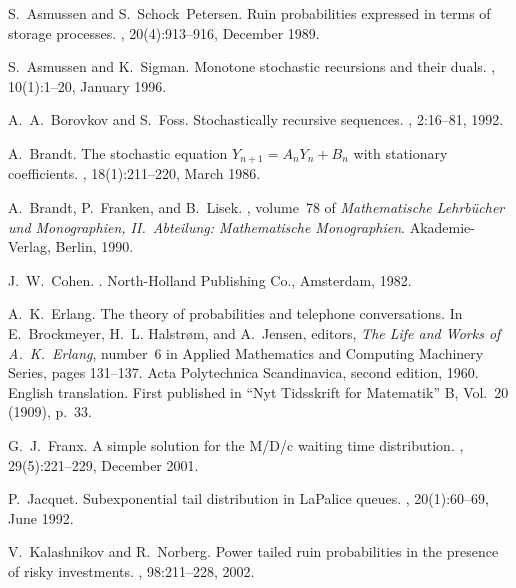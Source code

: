 \documentclass[reqno, 11pt, a4paper]{article}
\theoremstyle{plain}
\theoremstyle{remark}
\numberwithin{equation}{section}
\begin{document}
\begin{thebibliography}{28}
S.~Asmussen and S.~Schock~Petersen.
\newblock Ruin probabilities expressed in terms of storage processes.
, 20(4):913--916, December 1989.

S.~Asmussen and K.~Sigman.
\newblock Monotone stochastic recursions and their duals.
, 10(1):1--20, January 1996.

A.~A.~Borovkov and S.~Foss.
\newblock Stochastically recursive sequences.
, 2:16--81, 1992.

A.~Brandt.
\newblock The stochastic equation ${Y}_{n+1}={A}_n{Y}_n+{B}_n$ with stationary coefficients.
, 18(1):211--220, March 1986.

A.~Brandt, P.~Franken, and B.~Lisek.
, volume~78 of {\em Mathematische Lehrb\"ucher und Monographien, II.\ Abteilung: Mathematische Monographien}.
\newblock Akademie-Verlag, Berlin, 1990.

J.~W.~Cohen.
.
\newblock North-Holland Publishing Co., Amsterdam, 1982.

A.~K.~Erlang.
\newblock The theory of probabilities and telephone conversations.
\newblock In E.~Brockmeyer, H.~L. Halstr{\o}m, and A.~Jensen, editors, {\em The Life and Works of {A}.\ {K}.\ {E}rlang}, number~6 in Applied Mathematics and Computing Machinery Series, pages 131--137. Acta Polytechnica Scandinavica, second edition, 1960.
\newblock English translation. First published in ``{N}yt {T}idsskrift for {M}atematik'' {B}, Vol.\ 20 (1909), p.\ 33.

G.~J.~Franx.
\newblock A simple solution for the {M}/{D}/c waiting time distribution.
, 29(5):221--229, December 2001.

P.~Jacquet.
\newblock Subexponential tail distribution in {L}a{P}alice queues.
, 20(1):60--69, June 1992.

V.~Kalashnikov and R.~Norberg.
\newblock Power tailed ruin probabilities in the presence of risky investments.
, 98:211--228, 2002.


\end{thebibliography}
\end{document}
